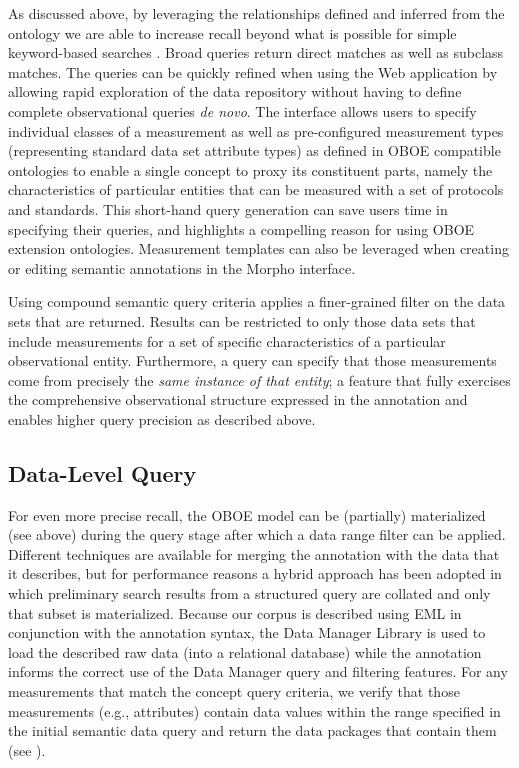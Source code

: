 As discussed above, by leveraging the relationships defined and
inferred from the ontology we are able to increase recall beyond what
is possible for simple keyword-based searches
\cite{berkley09:_improv_data_discov_for_metad}. Broad queries return
direct matches as well as subclass matches. The queries can be quickly
refined when using the Web application by allowing rapid exploration
of the data repository without having to define complete observational
queries \emph{de novo}. The interface allows users to specify
individual classes of a measurement as well as pre-configured
measurement types (representing standard data set attribute types) as
defined in OBOE compatible ontologies to enable a single concept to
proxy its constituent parts, namely the characteristics of particular
entities that can be measured with a set of protocols and
standards. This short-hand query generation can save users time in
specifying their queries, and highlights a compelling reason for using
OBOE extension ontologies. Measurement templates can also be leveraged when creating or
editing semantic annotations in the Morpho interface.

Using compound semantic query criteria applies a finer-grained filter
on the data sets that are returned. Results can be restricted to only
those data sets that include measurements for a set of specific
characteristics of a particular observational entity. Furthermore, a
query can specify that those measurements come from precisely the
\emph{same instance of that entity}; a feature that fully exercises
the comprehensive observational structure expressed in the annotation
and enables higher query precision as described above.

\subsection{Data-Level Query} 

For even more precise recall, the OBOE model can be (partially)
materialized (see above) during the query stage after which a data
range filter can be applied. Different techniques are available for
merging the annotation with the data that it describes, but for
performance reasons a hybrid approach has been adopted in which
preliminary search results from a structured query are collated and
only that subset is materialized. Because our corpus is described
using EML in conjunction with the annotation syntax, the Data Manager
Library \cite{leinfelder10:_metad_driven_approac_to_loadin} is used to
load the described raw data (into a relational database) while the
annotation informs the correct use of the Data Manager query and
filtering features. For any measurements that match the concept query
criteria, we verify that those measurements (e.g., attributes) contain
data values within the range specified in the initial semantic data
query and return the data packages that contain them (see
).


